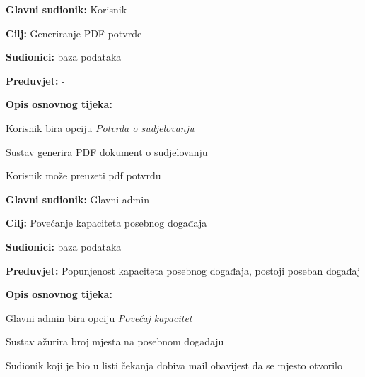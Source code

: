 				\noindent {}
			\begin{packed_item}
				
				\item \textbf{Glavni sudionik:} Korisnik
				\item  \textbf{Cilj:} Generiranje PDF potvrde
				\item  \textbf{Sudionici:} baza podataka
				\item  \textbf{Preduvjet:} -
				\item  \textbf{Opis osnovnog tijeka:}
				
				\item[] \begin{packed_enum}
					
					\item Korisnik bira opciju \textit{Potvrda o sudjelovanju}
					\item Sustav generira PDF dokument o sudjelovanju
					\item Korisnik može preuzeti pdf potvrdu
				\end{packed_enum}
			\end{packed_item}

        \noindent {}
			\begin{packed_item}
				
				\item \textbf{Glavni sudionik:} Glavni admin
				\item  \textbf{Cilj:} Povećanje kapaciteta posebnog događaja
				\item  \textbf{Sudionici:} baza podataka
				\item  \textbf{Preduvjet:} Popunjenost kapaciteta posebnog događaja, postoji poseban događaj
				\item  \textbf{Opis osnovnog tijeka:}
				
				\item[] \begin{packed_enum}
					
					\item Glavni admin bira opciju \textit{Povećaj kapacitet}
					\item Sustav ažurira broj mjesta na posebnom događaju
					\item Sudionik koji je bio u listi čekanja dobiva mail obavijest da se mjesto otvorilo
				\end{packed_enum}
			\end{packed_item}

